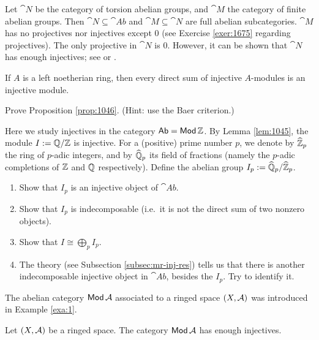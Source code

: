 \begin{exa}
Let $\cat{N}$ be the category of torsion abelian groups, and $\cat{M}$ the
category  of finite abelian groups. Then 
$\cat{N} \subseteq \cat{Ab}$
and $\cat{M} \subseteq \cat{N}$ are
full abelian subcategories. $\cat{M}$ has no projectives nor injectives except
$0$ (see Exercise \ref{exer:1675} regarding projectives). The only projective 
in $\cat{N}$ is $0$. However, it can be shown that $\cat{N}$ has enough 
injectives; see \cite[Lemma III.3.2]{Har} or \cite[Proposition 4.6]{Ye1}.
\end{exa}

\begin{prop} \label{prop:1046}
If $A$ is a left noetherian ring, then every direct sum of injective $A$-modules
is an injective module. 
\end{prop}

\begin{exer} \label{exer:1829}
Prove Proposition \ref{prop:1046}.
(Hint: use the Baer criterion.)
\end{exer}

\begin{exer} \label{exer:1045}
Here we study injectives in the category $\operatorname{\mathsf{Ab}} = \operatorname{\mathsf{Mod}} \mathbb{Z}$. 
By Lemma \ref{lem:1045}, the module $I := \mathbb{Q} / \mathbb{Z}$ is injective. For a 
(positive) prime number $p$, we denote by $\widehat{\mathbb{Z}}_p$ the ring of $p$-adic 
integers, and by $\widehat{\mathbb{Q}}_p$ its field of fractions (namely the $p$-adic 
completions of $\mathbb{Z}$ and $\mathbb{Q}$ respectively). Define the abelian group
$I_p := \widehat{\mathbb{Q}}_p / \widehat{\mathbb{Z}}_p$. 
\begin{enumerate}
\item Show that $I_p$ is an injective object of $\cat{Ab}$. 
\item Show that $I_p$ is indecomposable (i.e.\ it is not the direct sum of 
two nonzero objects). 
\item Show that $I \cong \bigoplus_p I_p$.
\item The theory (see Subsection \ref{subsec:mr-inj-res}) tells us that there 
is another indecomposable injective 
object in $\cat{Ab}$, besides the $I_p$. Try to identify it.
\end{enumerate}
\end{exer}

The abelian category $\operatorname{\mathsf{Mod}} \mathcal{A}$ associated to a ringed space $(X, 
\mathcal{A})$ was introduced in Example \ref{exa:1}.

\begin{prop} \label{prop:2875}
Let $(X, \mathcal{A})$ be a ringed space. The category $\operatorname{\mathsf{Mod}} \mathcal{A}$
has enough injectives. 
\end{prop}

